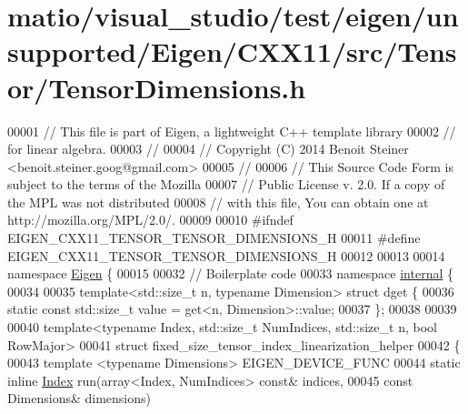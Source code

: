 \hypertarget{matio_2visual__studio_2test_2eigen_2unsupported_2_eigen_2_c_x_x11_2src_2_tensor_2_tensor_dimensions_8h_source}{}\section{matio/visual\+\_\+studio/test/eigen/unsupported/\+Eigen/\+C\+X\+X11/src/\+Tensor/\+Tensor\+Dimensions.h}
\label{matio_2visual__studio_2test_2eigen_2unsupported_2_eigen_2_c_x_x11_2src_2_tensor_2_tensor_dimensions_8h_source}

\begin{DoxyCode}
00001 \textcolor{comment}{// This file is part of Eigen, a lightweight C++ template library}
00002 \textcolor{comment}{// for linear algebra.}
00003 \textcolor{comment}{//}
00004 \textcolor{comment}{// Copyright (C) 2014 Benoit Steiner <benoit.steiner.goog@gmail.com>}
00005 \textcolor{comment}{//}
00006 \textcolor{comment}{// This Source Code Form is subject to the terms of the Mozilla}
00007 \textcolor{comment}{// Public License v. 2.0. If a copy of the MPL was not distributed}
00008 \textcolor{comment}{// with this file, You can obtain one at http://mozilla.org/MPL/2.0/.}
00009 
00010 \textcolor{preprocessor}{#ifndef EIGEN\_CXX11\_TENSOR\_TENSOR\_DIMENSIONS\_H}
00011 \textcolor{preprocessor}{#define EIGEN\_CXX11\_TENSOR\_TENSOR\_DIMENSIONS\_H}
00012 
00013 
00014 \textcolor{keyword}{namespace }\hyperlink{namespace_eigen}{Eigen} \{
00015 
00032 \textcolor{comment}{// Boilerplate code}
00033 \textcolor{keyword}{namespace }\hyperlink{namespaceinternal}{internal} \{
00034 
00035 \textcolor{keyword}{template}<std::\textcolor{keywordtype}{size\_t} n, \textcolor{keyword}{typename} Dimension> \textcolor{keyword}{struct }dget \{
00036   \textcolor{keyword}{static} \textcolor{keyword}{const} std::size\_t value = get<n, Dimension>::value;
00037 \};
00038 
00039 
00040 \textcolor{keyword}{template}<\textcolor{keyword}{typename} Index, std::\textcolor{keywordtype}{size\_t} NumIndices, std::\textcolor{keywordtype}{size\_t} n, \textcolor{keywordtype}{bool} RowMajor>
00041 \textcolor{keyword}{struct }fixed\_size\_tensor\_index\_linearization\_helper
00042 \{
00043   \textcolor{keyword}{template} <\textcolor{keyword}{typename} Dimensions> EIGEN\_DEVICE\_FUNC
00044   \textcolor{keyword}{static} \textcolor{keyword}{inline} \hyperlink{namespace_eigen_a62e77e0933482dafde8fe197d9a2cfde}{Index} run(array<Index, NumIndices> \textcolor{keyword}{const}& indices,
00045                           \textcolor{keyword}{const} Dimensions& dimensions)

\end{DoxyCode}
